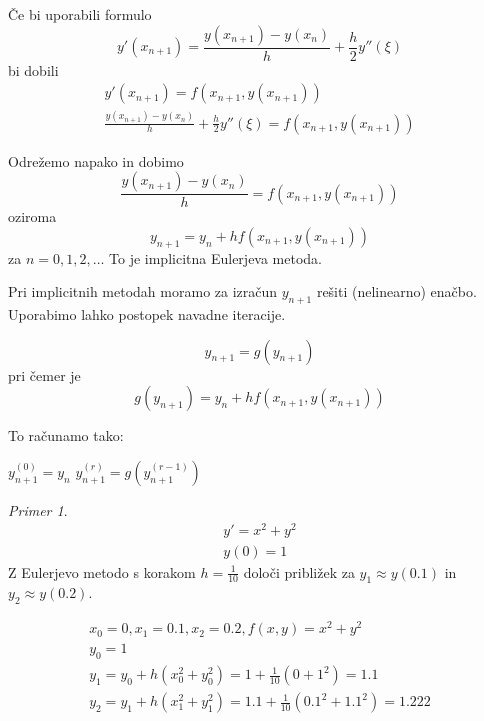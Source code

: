 \documentclass[a4paper,12pt]{article}
\theoremstyle{definition}
\theoremstyle{remark}
\newtheorem*{ex}{Primer}
\begin{document}
Če bi uporabili formulo
\begin{equation*}
    y'(x_{n+1}) = \frac{y(x_{n+1})-y(x_n)}{h} + \frac{h}{2} y''(\xi)
\end{equation*}
bi dobili
\begin{gather*}
    y'(x_{n+1}) = f(x_{n+1}, y(x_{n+1})) \\
    \frac{y(x_{n+1})-y(x_n)}{h} + \frac{h}{2} y''(\xi) = f(x_{n+1}, y(x_{n+1}))
\end{gather*}

Odrežemo napako in dobimo
\begin{equation*}
    \frac{y(x_{n+1})-y(x_n)}{h} = f(x_{n+1}, y(x_{n+1}))
\end{equation*}
oziroma
\begin{equation*}
    y_{n+1} = y_n + h f(x_{n+1}, y(x_{n+1}))
\end{equation*}
za $n = 0, 1, 2, \dots$ To je implicitna Eulerjeva metoda.

Pri implicitnih metodah moramo za izračun $y_{n+1}$ rešiti (nelinearno) enačbo. Uporabimo lahko postopek navadne iteracije.

\begin{equation*}
    y_{n+1} = g(y_{n+1})
\end{equation*}
pri čemer je
\begin{equation*}
    g(y_{n+1}) = y_n + h f(x_{n+1}, y(x_{n+1}))
\end{equation*}

To računamo tako:
\begin{algorithmic}
    \State $y_{n+1}^{(0)} = y_n$
    \Do
        \State $y_{n+1}^{(r)} = g(y_{n+1}^{(r-1)})$
\end{algorithmic}



\begin{ex}
    \begin{gather*}
        y' = x^2 + y^2 \\
        y(0) = 1
    \end{gather*}
    Z Eulerjevo metodo s korakom $h = \frac{1}{10}$ določi približek za $y_1 \approx y(0.1)$ in $y_2 \approx y(0.2)$.

    \begin{gather*}
        x_0 = 0, x_1 = 0.1, x_2 = 0.2, f(x, y) = x^2 + y^2 \\
        y_0 = 1 \\
        y_1 = y_0 + h(x_0^2 + y_0^2) = 1 + \frac{1}{10}(0 + 1^2) = 1.1 \\
        y_2 = y_1 + h(x_1^2 + y_1^2) = 1.1 + \frac{1}{10}(0.1^2 + 1.1^2) = 1.222
    \end{gather*}
\end{ex}
\end{document}

